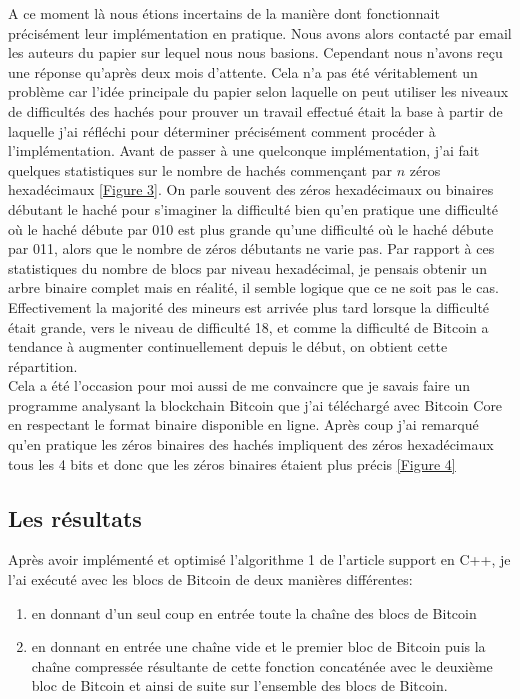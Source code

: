 \documentclass[12pt,a4paper]{article}
\newcommand{\annexe}[2]{\hyperlink{#1}{[Figure #2]}}
\begin{document}
	A ce moment là nous étions incertains de la manière dont fonctionnait précisément leur implémentation en pratique. Nous avons alors contacté par email les auteurs du papier sur lequel nous nous basions. Cependant nous n'avons reçu une réponse qu'après deux mois d'attente. Cela n'a pas été véritablement un problème car l'idée principale du papier selon laquelle on peut utiliser les niveaux de difficultés des hachés pour prouver un travail effectué était la base à partir de laquelle j'ai réfléchi pour déterminer précisément comment procéder à l'implémentation. Avant de passer à une quelconque implémentation, j'ai fait quelques statistiques sur le nombre de hachés commençant par $n$ zéros hexadécimaux \annexe{23}{3}. On parle souvent des zéros hexadécimaux ou binaires débutant le haché pour s'imaginer la difficulté bien qu'en pratique une difficulté où le haché débute par 010 est plus grande qu'une difficulté où le haché débute par 011, alors que le nombre de zéros débutants ne varie pas. Par rapport à ces statistiques du nombre de blocs par niveau hexadécimal, je pensais obtenir un arbre binaire complet mais en réalité, il semble logique que ce ne soit pas le cas. Effectivement la majorité des mineurs est arrivée plus tard lorsque la difficulté était grande, vers le niveau de difficulté 18, et comme la difficulté de Bitcoin a tendance à augmenter continuellement depuis le début, on obtient cette répartition.\\ %
Cela a été l'occasion pour moi aussi de me convaincre que je savais faire un programme analysant la blockchain Bitcoin que j'ai téléchargé avec Bitcoin Core en respectant le format binaire disponible en ligne. Après coup j'ai remarqué qu'en pratique les zéros binaires des hachés impliquent des zéros hexadécimaux tous les 4 bits et donc que les zéros binaires étaient plus précis \annexe{24}{4} %
	
	
	
	\subsection{Les résultats}
	
	Après avoir implémenté et optimisé l'algorithme 1 de l'article support en C++, je l'ai exécuté avec les blocs de Bitcoin de deux manières différentes:\\
	\begin{enumerate}
		\item en donnant d'un seul coup en entrée toute la chaîne des blocs de Bitcoin\\
	  \item en donnant en entrée une chaîne vide et le premier bloc de Bitcoin puis la chaîne compressée résultante de cette fonction concaténée avec le deuxième bloc de Bitcoin et ainsi de suite sur l'ensemble des blocs de Bitcoin.\\
	\end{enumerate}
	
\end{document}
